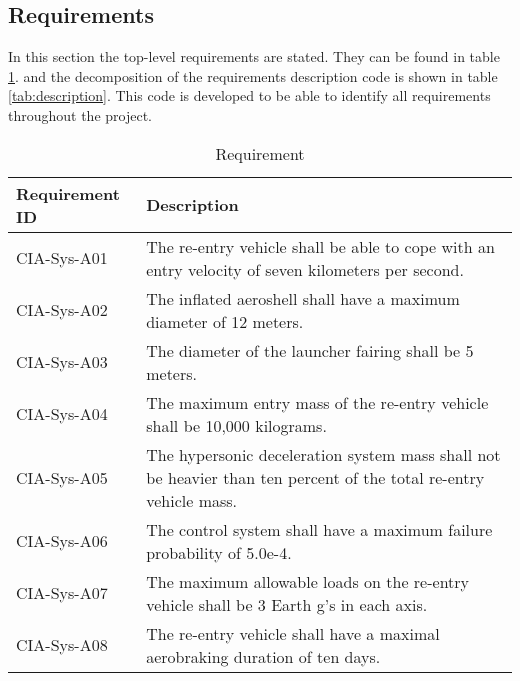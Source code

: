 \subsection{Requirements} \label{subsec:systemrequirements}
In this section the top-level requirements are stated. They can be found in table \ref{tab:requirements}. and the decomposition of the requirements description code is shown in table \ref{tab:description}. This code is developed to be able to identify all requirements throughout the project.

\begin{table}[H]
	\caption{Requirement}
	\begin{tabular}{|p{}|p{}|}
    \hline
    Requirement ID          & Description                                                                                                      \\ \hline \hline
    CIA-Sys-A01 & The re-entry vehicle shall be able to cope with an entry velocity of seven kilometers per second.                \\ \hline
    CIA-Sys-A02 & The inflated aeroshell shall have a maximum diameter of 12 meters.                                               \\ \hline
    CIA-Sys-A03 & The diameter of the launcher fairing shall be 5 meters.                                                          \\ \hline
    CIA-Sys-A04 & The maximum entry mass of the re-entry vehicle shall be 10,000 kilograms.                                         \\ \hline
    CIA-Sys-A05 & The hypersonic deceleration system mass shall not be heavier than ten percent of the total re-entry vehicle mass. \\ \hline
    CIA-Sys-A06 & The control system shall have a maximum failure probability of 5.0e-4.                                           \\ \hline
    CIA-Sys-A07 & The maximum allowable loads on the re-entry vehicle shall be 3 Earth g's in each axis.                            \\ \hline
    CIA-Sys-A08 & The re-entry vehicle shall have a maximal aerobraking duration of ten days.                                      \\ \hline
    \end{tabular}
    \label{tab:requirements}
\end{table}

